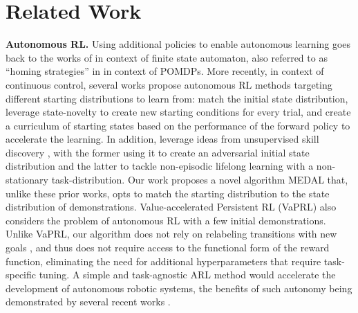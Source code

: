 \documentclass[nohyperref]{article}
\theoremstyle{plain}
\theoremstyle{definition}
\theoremstyle{remark}
\begin{document}
\section{Related Work}
\textbf{Autonomous RL.} Using additional policies to enable autonomous learning goes back to the works of \citep{rivest1993inference} in context of finite state automaton, also referred to as ``homing strategies'' in \citep{even2005reinforcement} in context of POMDPs. More recently, in context of continuous control, several works propose autonomous RL methods targeting different starting distributions to learn from: \citet{han2015learning, eysenbach2017leave} match the initial state distribution, \citet{zhu20ingredients} leverage state-novelty \citep{burda2018exploration} to create new starting conditions for every trial, and \citet{sharma2021autonomouscurr} create a curriculum of starting states based on the performance of the forward policy to accelerate the learning. In addition, \citep{xu2020continual, lu2020reset} leverage ideas from unsupervised skill discovery \citep{gregor2016variational, eysenbach2018diversity,sharma2019dynamics, hazan2019provably, campos2020explore},
with the former using it to create an adversarial initial state distribution and the latter to tackle non-episodic lifelong learning with a non-stationary task-distribution. Our work proposes a novel algorithm MEDAL that, unlike these prior works,
opts to match the starting distribution to the state distribution
of demonstrations.
Value-accelerated Persistent RL (VaPRL) \citep{sharma2021autonomouscurr} also considers the problem of autonomous RL with a few initial demonstrations.
Unlike VaPRL, our algorithm does not rely on relabeling transitions with new goals \citep{andrychowicz2017hindsight}, and thus does not require access to the functional form of the reward function, eliminating the need for additional hyperparameters that require task-specific tuning.
A simple and task-agnostic ARL method would accelerate the development of autonomous robotic systems, the benefits of such autonomy being demonstrated by several recent works
\citep{chatzilygeroudis2018reset, gupta2021reset,smith2021legged, ha2020learning, bloesch2022towards}.
\end{document}
